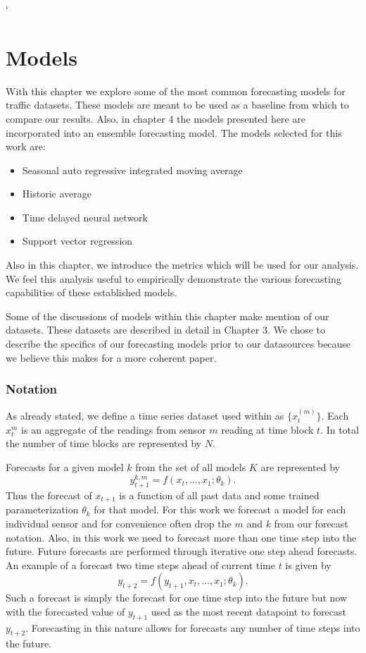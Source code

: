 `\chapter{Models}
With this chapter we explore some of the most common forecasting models for traffic datasets.  These models are meant to be used as a baseline from which to compare our results.  Also, in chapter 4 the models presented here are incorporated into an ensemble forecasting model.  The models selected for this work are:

\begin{itemize}
	\item Seasonal auto regressive integrated moving average
	\item Historic average
	\item Time delayed neural network
	\item Support vector regression
\end{itemize}


Also in this chapter, we introduce the metrics which will be used for our analysis.  We feel this analysis useful to empirically demonstrate the various forecasting capabilities of these established models.

Some of the discussions of models within this chapter make mention of our datasets.  These datasets are described in detail in Chapter 3.  We chose to describe the specifics of our forecasting models prior to our datasources because we believe this makes for a more coherent paper.

\subsection{Notation}
As already stated, we define a time series dataset used within as  $\{x_{t}^{(m)}\}$.  Each $x_{t}^{m}$ is an aggregate of the readings from sensor $m$ reading at time block $t$.  In total the number of time blocks are represented by $N$.

Forecasts for a given model $k$ from the set of all models $K$ are represented by 
\begin{equation}
y_{t + 1}^{k, m} = f(x_{t}, ..., x_{1}; \theta_{k}).
\end{equation}
\noindent
Thus the forecast of $x_{t + 1}$ is a function of all past data and some trained parameterization $\theta_{k}$ for that model.  For this work we forecast a model for each individual sensor and for convenience often drop the $m$ and $k$ from our forecast notation.  Also, in this work we need to forecast more than one time step into the future.  Future forecasts are performed through iterative one step ahead forecasts.    An example of a forecast two time steps ahead of current time $t$ is given by 
\begin{equation}
y_{t + 2} = f(y_{t + 1}, x_{t}, ..., x_{1}; \theta_{k}).
\end{equation}
\noindent
Such a forecast is simply the forecast for one time step into the future but now with the forecasted value of $y_{t + 1}$ used as the most recent datapoint to forecast $y_{t + 2}$.  Forecasting in this nature allows for forecasts any number of time steps into the future.

